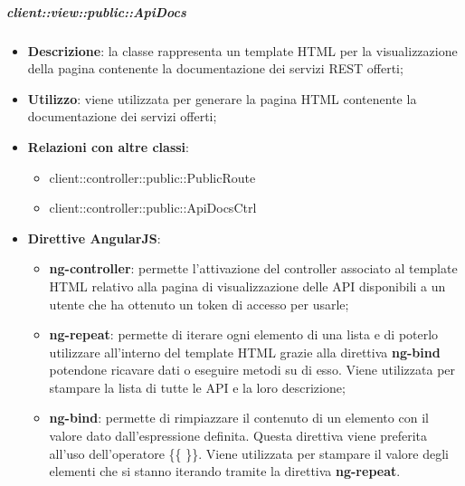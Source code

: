 		\subparagraph{client::view::public::ApiDocs} %
		\label{subp:bdsm_app_client_view_public_apidocs}
		
			\begin{itemize}
				\item \textbf{Descrizione}: la classe rappresenta un template HTML per la visualizzazione della pagina contenente la documentazione dei servizi REST offerti;
				\item \textbf{Utilizzo}: viene utilizzata per generare la pagina HTML contenente la documentazione dei servizi offerti;
				\item \textbf{Relazioni con altre classi}:
					\begin{itemize}
						\item client::controller::public::PublicRoute
						\item client::controller::public::ApiDocsCtrl
					\end{itemize}
				\item \textbf{Direttive AngularJS}:
					\begin{itemize}
						\item \textbf{ng-controller}: permette l'attivazione del controller associato al template HTML relativo alla pagina di visualizzazione delle API disponibili a un utente che ha ottenuto un token di accesso per usarle;
						\item \textbf{ng-repeat}: permette di iterare ogni elemento di una lista e di poterlo utilizzare all'interno del template HTML grazie alla direttiva \textbf{ng-bind} potendone ricavare dati o eseguire metodi su di esso. Viene utilizzata per stampare la lista di tutte le API e la loro descrizione;
						\item \textbf{ng-bind}: permette di rimpiazzare il contenuto di un elemento con il valore dato dall'espressione definita. Questa direttiva viene preferita all'uso dell'operatore \{\{ \}\}. Viene utilizzata per stampare il valore degli elementi che si stanno iterando tramite la direttiva \textbf{ng-repeat}.
					\end{itemize}
			\end{itemize}



